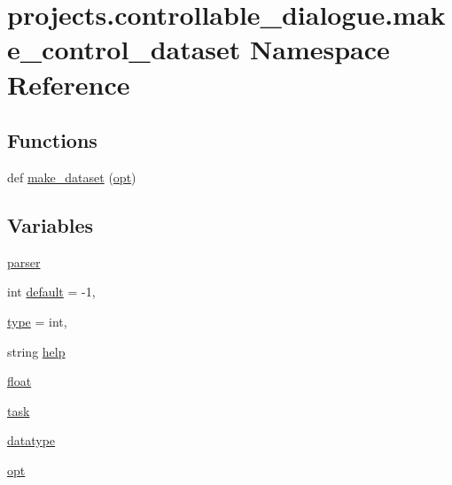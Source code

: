 \hypertarget{namespaceprojects_1_1controllable__dialogue_1_1make__control__dataset}{}\section{projects.\+controllable\+\_\+dialogue.\+make\+\_\+control\+\_\+dataset Namespace Reference}
\label{namespaceprojects_1_1controllable__dialogue_1_1make__control__dataset}
\subsection*{Functions}
\begin{DoxyCompactItemize}
\item 
def \hyperlink{namespaceprojects_1_1controllable__dialogue_1_1make__control__dataset_a8b209e575769f92c93ceb2c06e70fee1}{make\+\_\+dataset} (\hyperlink{namespaceprojects_1_1controllable__dialogue_1_1make__control__dataset_ab945d95ab130dd8f09fea9282bb7513d}{opt})
\end{DoxyCompactItemize}
\subsection*{Variables}
\begin{DoxyCompactItemize}
\item 
\hyperlink{namespaceprojects_1_1controllable__dialogue_1_1make__control__dataset_ad4b34cd0357d91d46706e2a2f86e001e}{parser}
\item 
int \hyperlink{namespaceprojects_1_1controllable__dialogue_1_1make__control__dataset_a84cdac7bc463ce88fbc8fa3a4a170f89}{default} = -\/1,
\item 
\hyperlink{namespaceprojects_1_1controllable__dialogue_1_1make__control__dataset_ac18f1b93e514ccda4429a60f66e78367}{type} = int,
\item 
string \hyperlink{namespaceprojects_1_1controllable__dialogue_1_1make__control__dataset_a0b0c1f19d48abcb5f44cface2e2bb1bc}{help}
\item 
\hyperlink{namespaceprojects_1_1controllable__dialogue_1_1make__control__dataset_aa2b7207688c641dbc094ab44eca27113}{float}
\item 
\hyperlink{namespaceprojects_1_1controllable__dialogue_1_1make__control__dataset_a0bead021e69d59fb4cdff2e7705f1f0e}{task}
\item 
\hyperlink{namespaceprojects_1_1controllable__dialogue_1_1make__control__dataset_ae6fa23d8106a608fbab7aae77d8bac39}{datatype}
\item 
\hyperlink{namespaceprojects_1_1controllable__dialogue_1_1make__control__dataset_ab945d95ab130dd8f09fea9282bb7513d}{opt}
\end{DoxyCompactItemize}


